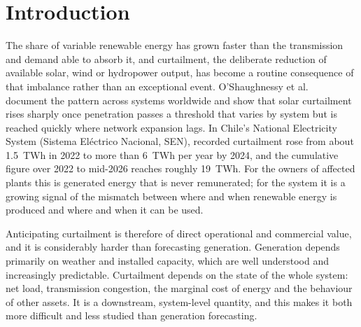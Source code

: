 \documentclass[preprint,3p,times]{elsarticle}
\begin{document}
\section{Introduction}
\label{sec:intro}

The share of variable renewable energy has grown faster than the transmission and demand able to absorb it, and curtailment, the deliberate reduction of available solar, wind or hydropower output, has become a routine consequence of that imbalance rather than an exceptional event. O'Shaughnessy et al.~\cite{oshaughnessy2020} document the pattern across systems worldwide and show that solar curtailment rises sharply once penetration passes a threshold that varies by system but is reached quickly where network expansion lags. In Chile's National Electricity System (Sistema El\'ectrico Nacional, SEN), recorded curtailment rose from about 1.5~TWh in 2022 to more than 6~TWh per year by 2024, and the cumulative figure over 2022 to mid-2026 reaches roughly 19~TWh. For the owners of affected plants this is generated energy that is never remunerated; for the system it is a growing signal of the mismatch between where and when renewable energy is produced and where and when it can be used.

Anticipating curtailment is therefore of direct operational and commercial value, and it is considerably harder than forecasting generation. Generation depends primarily on weather and installed capacity, which are well understood and increasingly predictable. Curtailment depends on the state of the whole system: net load, transmission congestion, the marginal cost of energy and the behaviour of other assets. It is a downstream, system-level quantity, and this makes it both more difficult and less studied than generation forecasting.
\end{document}
